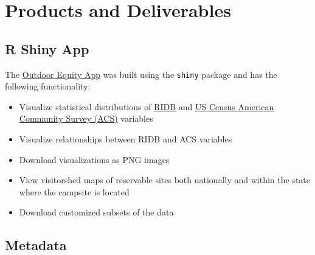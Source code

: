 \documentclass[
  11 pt,
  openany]{book}
\providecommand{\tightlist}{%
  \setlength{\itemsep}{0pt}\setlength{\parskip}{0pt}}
\begin{document}
\hypertarget{products-and-deliverables}{%
\chapter{Products and Deliverables}\label{products-and-deliverables}}

\hypertarget{r-shiny-app}{%
\section{R Shiny App}\label{r-shiny-app}}

The \href{https://shinyapps.bren.ucsb.edu/oe_app/}{Outdoor Equity App} was built using the \texttt{shiny} package \citep{R-shiny} and has the following functionality:

\begin{itemize}
\tightlist
\item
  Visualize statistical distributions of \href{https://ridb.recreation.gov/download}{RIDB} and \href{https://www.census.gov/programs-surveys/acs/data.html}{US Census American Community Survey (ACS)} variables
\item
  Visualize relationships between RIDB and ACS variables
\item
  Download visualizations as PNG images
\item
  View visitorshed maps of reservable sites both nationally and within the state where the campsite is located
\item
  Download customized subsets of the data
\end{itemize}

\hypertarget{metadata}{%
\section{Metadata}\label{metadata}}
\end{document}
